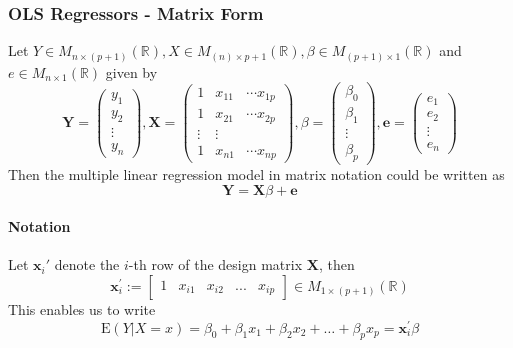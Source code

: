 \documentclass[11pt]{article}
\newcommand{\R}{\mathbb{R}}
\newcommand{\mat}[2]{M_{#1 \times #2}(\R)}
\newcommand{\bx}{\mathbf{x}}
\begin{document}
\subsubsection{OLS Regressors - Matrix Form}
Let $Y \in \mat{n}{(p+1)}, X\in \mat{(n)}{p+1}, \beta\in \mat{(p+1)}{1}$ and $e\in \mat{n}{1}$ given by
\begin{equation*}
    \mathbf{Y}=\left(\begin{array}{c}{y_{1}} \\ {y_{2}} \\ {\vdots} \\ {y_{n}}\end{array}\right), \mathbf{X}=\left(\begin{array}{ccc}{1} & {x_{11}} & {\cdots x_{1 p}} \\ {1} & {x_{21}} & {\cdots x_{2 p}} \\ {\vdots} & {\vdots} & {} \\ {1} & {x_{n 1}} & {\cdots x_{n p}}\end{array}\right), \beta=\left(\begin{array}{c}{\beta_{0}} \\ {\beta_{1}} \\ {\vdots} \\ {\beta_{p}}\end{array}\right), \mathbf{e}=\left(\begin{array}{c}{e_{1}} \\ {e_{2}} \\ {\vdots} \\ {e_{n}}\end{array}\right)
\end{equation*}
Then the multiple linear regression model in matrix notation could be written as
\begin{equation*}
    \mathbf{Y}=\mathbf{X} \beta+\mathbf{e}
\end{equation*}
\paragraph{Notation} Let $\bx_i'$ denote the $i$-th row of the design matrix $\mathbf{X}$, then
\begin{equation*}
    \mathbf{x}_{i}^{\prime}:=\begin{bmatrix}
        1 & x_{i1} & x_{i2} & ... & x_{ip} 
    \end{bmatrix} 
    \in \mat{1}{(p+1)}
\end{equation*}
This enables us to write 
\begin{equation*}
    \mathrm{E}(Y | X=x)=\beta_{0}+\beta_{1} x_{1}+\beta_{2} x_{2}+\ldots+\beta_{p} x_{p}=\mathbf{x}_{i}^{\prime} \beta
\end{equation*}
\end{document}
